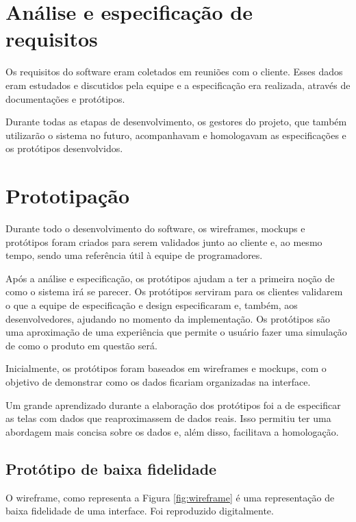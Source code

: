 \section{Análise e especificação de requisitos}
Os requisitos do software eram coletados em reuniões com o cliente. Esses dados eram estudados e discutidos pela equipe e a especificação era realizada, através de documentações e protótipos.

Durante todas as etapas de desenvolvimento, os gestores do projeto, que também utilizarão o sistema no futuro, acompanhavam e homologavam as especificações e os protótipos desenvolvidos.

\section{Prototipação}


Durante todo o desenvolvimento do software, os wireframes, mockups e protótipos foram criados para serem validados junto ao cliente e, ao mesmo tempo, sendo uma referência útil à equipe de programadores.

Após a análise e especificação, os protótipos ajudam a ter a primeira noção de como o sistema irá se parecer. Os protótipos serviram para os clientes validarem o que a equipe de especificação e design especificaram e, também, aos desenvolvedores, ajudando no momento da implementação. Os protótipos são uma aproximação de uma experiência que permite o usuário fazer uma simulação de como o produto em questão será.

Inicialmente, os protótipos foram baseados em wireframes e mockups, com o objetivo de demonstrar como os dados ficariam organizadas na interface.  

Um grande aprendizado durante a elaboração dos protótipos foi a de especificar as telas com dados que reaproximassem de dados reais. Isso permitiu ter uma abordagem mais concisa sobre os dados e, além disso, facilitava a homologação.

\subsection{Protótipo de baixa fidelidade}

O wireframe, como representa a Figura \ref{fig:wireframe} é uma representação de baixa fidelidade de uma interface. Foi reproduzido digitalmente.

